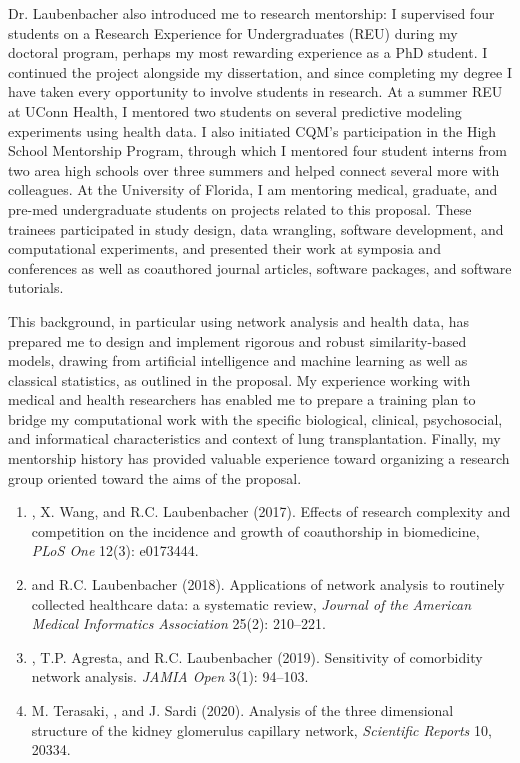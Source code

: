 \documentclass{nihbiosketch}
\begin{document}
\begin{statement}
Dr. Laubenbacher also introduced me to research mentorship: I supervised four students on a Research Experience for Undergraduates (REU) during my doctoral program, perhaps my most rewarding experience as a PhD student. I continued the project alongside my dissertation, and since completing my degree I have taken every opportunity to involve students in research. At a summer REU at UConn Health, I mentored two students on several predictive modeling experiments using health data. I also initiated CQM's participation in the High School Mentorship Program, through which I mentored four student interns from two area high schools over three summers and helped connect several more with colleagues. At the University of Florida, I am mentoring medical, graduate, and pre-med undergraduate students on projects related to this proposal. These trainees participated in study design, data wrangling, software development, and computational experiments, and presented their work at symposia and conferences as well as coauthored journal articles, software packages, and software tutorials.

This background, in particular using network analysis and health data, has prepared me to design and implement rigorous and robust similarity-based models, drawing from artificial intelligence and machine learning as well as classical statistics, as outlined in the proposal.
My experience working with medical and health researchers has enabled me to prepare a training plan to bridge my computational work with the specific biological, clinical, psychosocial, and informatical characteristics and context of lung transplantation.
Finally, my mentorship history has provided valuable experience toward organizing a research group oriented toward the aims of the proposal.

\begin{enumerate}

\item {}, X. Wang, and R.C. Laubenbacher (2017). Effects of research complexity and competition on the incidence and growth of coauthorship in biomedicine, \emph{PLoS One} 12(3): e0173444.
\item {} and R.C. Laubenbacher (2018). Applications of network analysis to routinely collected healthcare data: a systematic review, \emph{Journal of the American Medical Informatics Association} 25(2): 210--221.
\item {}, T.P. Agresta, and R.C. Laubenbacher (2019). Sensitivity of comorbidity network analysis. \emph{JAMIA Open} 3(1): 94--103.
\item M. Terasaki, , and J. Sardi (2020). Analysis of the three dimensional structure of the kidney glomerulus capillary network, \emph{Scientific Reports} 10, 20334.

\end{enumerate}

\end{statement}
\end{document}
